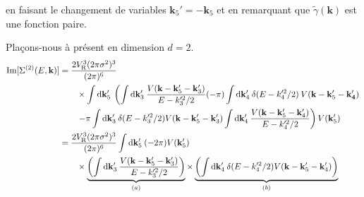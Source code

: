 en faisant le changement de variables $\mathbf{k}_{\mathrm{5}}'=-\mathbf{k}_{\mathrm{5}}$ et en remarquant que $\tilde{\gamma}(\mathbf{k}) $ est une fonction paire.

Plaçons-nous à présent en dimension $d=2$.
\begin{align}
\mathrm{Im}[ \Sigma^{(2)}(E,\mathbf{k})]&= \frac{2V_{\mathrm{R}}^3 (2\pi\sigma^2)^3}{(2\pi)^6} \\
&\nonumber \qquad\times\int{\mathop{}\mathopen{}\mathrm{d}\mathbf{k}_{\mathrm{5}}' \: \left( \int{\mathop{}\mathopen{}\mathrm{d}\mathbf{k}_{\mathrm{3}}' \: \frac{V(\mathbf{k}-\mathbf{k}_{\mathrm{5}}'-\mathbf{k}_{\mathrm{3}}')}{E-k_{\mathrm{3}}'^2/2}} (-\pi) \int{\mathop{}\mathopen{}\mathrm{d}\mathbf{k}_{\mathrm{4}}' \: \delta(E-k_{\mathrm{4}}'^2/2) \: V(\mathbf{k}-\mathbf{k}_{\mathrm{5}}'-\mathbf{k}_{\mathbf{4}}')} \right.} \\
&\nonumber \qquad \left.-\pi\int{\mathop{}\mathopen{}\mathrm{d}\mathbf{k}_{\mathrm{3}}' \: \delta(E-k_{\mathrm{3}}'^2/2) V(\mathbf{k}-\mathbf{k}_{\mathrm{5}}'-\mathbf{k}_{\mathrm{3}}')} \int{\mathop{}\mathopen{}\mathrm{d}\mathbf{k}_{\mathrm{4}}' \: \frac{V(\mathbf{k}-\mathbf{k}_{\mathrm{5}}'-\mathbf{k}_{\mathrm{4}}')}{E-k_{\mathrm{4}}'^2/2}}\right) V(\mathbf{k}_{\mathrm{5}}') \\
&= \frac{2V_{\mathrm{R}}^3 (2\pi\sigma^2)^3}{(2\pi)^6} \int{\mathop{}\mathopen{}\mathrm{d}\mathbf{k}_{\mathrm{5}}' \: (-2\pi) V(\mathbf{k}_{\mathrm{5}}')} \\
&\nonumber\qquad \times\underbrace{\left(\int{\mathop{}\mathopen{}\mathrm{d}\mathbf{k}_{\mathrm{3}}' \:\frac{V(\mathbf{k}-\mathbf{k}_{\mathrm{5}}'-\mathbf{k}_{\mathrm{3}}')}{E-k_{\mathrm{3}}'^2/2}}\right)}_{(a)} \times \underbrace{\left(\int{\mathop{}\mathopen{}\mathrm{d}\mathbf{k}_{\mathrm{4}}'\:\delta(E-k_{\mathrm{4}}'^2/2) V(\mathbf{k}-\mathbf{k}_{\mathrm{5}}'-\mathbf{k}_{\mathrm{4}}')}\right)}_{(b)}
\end{align}

